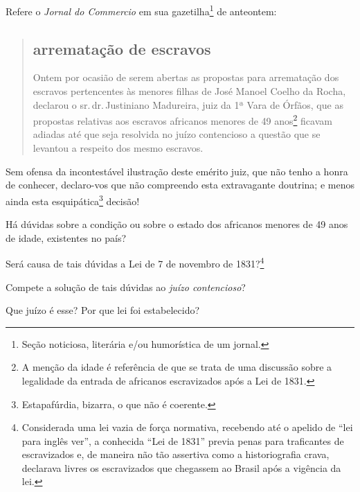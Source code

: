 {Refere o \emph{Jornal do Commercio} em sua gazetilha\footnote{Seção 
  noticiosa, literária e/ou humorística de um jornal.} de anteontem:

\begin{quote}
\subsection{arrematação de escravos}

Ontem por ocasião de serem abertas as propostas para arrematação dos
escravos pertencentes às menores filhas de José Manoel Coelho da Rocha,
declarou o sr.\,dr.\,Justiniano Madureira, juiz da 1ª Vara de Órfãos, que
as propostas relativas aos escravos africanos menores de 49
anos\footnote{A menção da idade é referência de que se trata de uma
  discussão sobre a legalidade da entrada de africanos escravizados após
  a Lei de 1831.} ficavam adiadas até que seja resolvida no juízo
contencioso a questão que se levantou a respeito dos mesmo escravos.
\end{quote}

Sem ofensa da incontestável ilustração deste emérito juiz, que não tenho
a honra de conhecer, declaro-vos que não compreendo esta extravagante
doutrina; e menos ainda esta esquipática\footnote{Estapafúrdia,
  bizarra, o que não é coerente.} decisão!

Há dúvidas sobre a condição ou sobre o estado dos africanos menores de
49 anos de idade, existentes no país?

Será causa de tais dúvidas a Lei de 7 de novembro de 1831?\footnote{
  Considerada uma lei vazia de força normativa, recebendo até o apelido
  de ``lei para inglês ver'', a conhecida ``Lei de 1831'' previa penas para
  traficantes de escravizados e, de maneira não tão assertiva como a
  historiografia crava, declarava livres os escravizados que chegassem
  ao Brasil após a vigência da lei.}

Compete a solução de tais dúvidas ao \emph{juízo contencioso}?

Que juízo é esse? Por que lei foi estabelecido?

}
